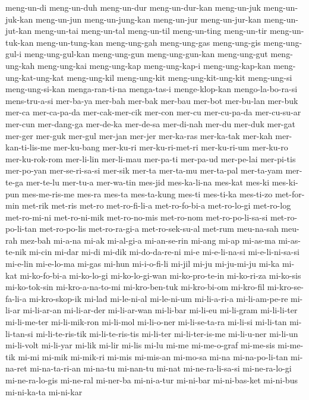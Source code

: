 {meng-un-di meng-un-duh meng-un-dur meng-un-dur-kan meng-un-juk
meng-un-juk-kan meng-un-jun meng-un-jung-kan meng-un-jur meng-un-jur-kan
meng-un-jut-kan meng-un-tai meng-un-tal meng-un-til meng-un-ting
meng-un-tir meng-un-tuk-kan meng-un-tung-kan meng-ung-gah meng-ung-gas
meng-ung-gis meng-ung-gul-i meng-ung-gul-kan meng-ung-gun meng-ung-gun-kan
meng-ung-gut meng-ung-kah meng-ung-kai meng-ung-kap meng-ung-kap-i
meng-ung-kap-kan meng-ung-kat-ung-kat meng-ung-kil meng-ung-kit
meng-ung-kit-ung-kit meng-ung-si meng-ung-si-kan menga-ran-ti-na
menga-tas-i menge-klop-kan mengo-la-bo-ra-si mens-tru-a-si mer-ba-ya
mer-bah mer-bak mer-bau mer-bot mer-bu-lan mer-buk mer-ca mer-ca-pa-da
mer-cak-mer-cik mer-con mer-cu mer-cu-pa-da mer-cu-su-ar mer-cun
mer-dang-ga mer-de-ka mer-de-sa mer-di-nah mer-du mer-duk mer-gat mer-ger
mer-guk mer-gul mer-jan mer-jer mer-ka-ras mer-ka-tak mer-kah
mer-kan-ti-lis-me mer-ku-bang mer-ku-ri mer-ku-ri-met-ri mer-ku-ri-um
mer-ku-ro mer-ku-rok-rom mer-li-lin mer-li-mau mer-pa-ti mer-pa-ud
mer-pe-lai mer-pi-tis mer-po-yan mer-se-ri-sa-si mer-sik mer-ta mer-ta-mu
mer-ta-pal mer-ta-yam mer-te-ga mer-te-lu mer-tu-a mer-wa-tin mes-jid
mes-ka-li-na mes-kat mes-ki mes-ki-pun mes-me-ris-me mes-ra mes-ta
mes-ta-kung mes-ti mes-ti-ka mes-ti-zo met-for-min met-rik met-ris met-ro
met-ro-fi-li-a met-ro-fo-bi-a met-ro-lo-gi met-ro-log met-ro-mi-ni
met-ro-ni-mik met-ro-no-mis met-ro-nom met-ro-po-li-sa-si met-ro-po-li-tan
met-ro-po-lis met-ro-ra-gi-a met-ro-sek-su-al met-rum meu-na-sah meu-rah
mez-bah mi-a-na mi-ak mi-al-gi-a mi-an-se-rin mi-ang mi-ap mi-as-ma
mi-as-te-nik mi-cin mi-dar mi-di mi-dik mi-do-da-re-ni mi-e mi-e-li-na-si
mi-e-li-ni-sa-si mi-e-lin mi-e-lo-ma mi-gas mi-hun mi-i-o-fi-li mi-jil
mi-ju mi-ju-mi-ju mi-ka mi-kat mi-ko-fo-bi-a mi-ko-lo-gi mi-ko-lo-gi-wan
mi-ko-pro-te-in mi-ko-ri-za mi-ko-sis mi-ko-tok-sin mi-kro-a-na-to-mi
mi-kro-ben-tuk mi-kro-bi-om mi-kro-fil mi-kro-se-fa-li-a mi-kro-skop-ik
mi-lad mi-le-ni-al mi-le-ni-um mi-li-a-ri-a mi-li-am-pe-re mi-li-ar
mi-li-ar-an mi-li-ar-der mi-li-ar-wan mi-li-bar mi-li-eu mi-li-gram
mi-li-li-ter mi-li-me-ter mi-li-mik-ron mi-li-mol mi-li-o-ner
mi-li-se-ta-ra mi-li-si mi-li-tan mi-li-tan-si mi-li-te-ris-tik
mi-li-te-ris-tis mi-li-ter mi-li-ter-is-me mi-li-u-ner mi-li-un mi-li-volt
mi-li-yar mi-lik mi-lir mi-lis mi-lu mi-me mi-me-o-graf mi-me-sis
mi-me-tik mi-mi mi-mik mi-mik-ri mi-mis mi-mis-an mi-mo-sa mi-na
mi-na-po-li-tan mi-na-ret mi-na-ta-ri-an mi-na-tu mi-nan-tu mi-nat
mi-ne-ra-li-sa-si mi-ne-ra-lo-gi mi-ne-ra-lo-gis mi-ne-ral mi-ner-ba
mi-ni-a-tur mi-ni-bar mi-ni-bas-ket mi-ni-bus mi-ni-ka-ta mi-ni-kar
}
